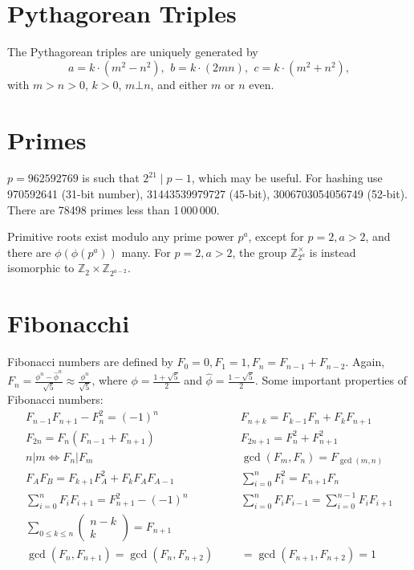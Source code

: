 
\section{Pythagorean Triples}
 The Pythagorean triples are uniquely generated by
 \[ a=k\cdot (m^{2}-n^{2}),\ \,b=k\cdot (2mn),\ \,c=k\cdot (m^{2}+n^{2}), \]
 with $m > n > 0$, $k > 0$, $m \bot n$, and either $m$ or $n$ even.

\section{Primes}
	$p=962592769$ is such that $2^{21} \mid p-1$, which may be useful. For hashing
	use 970592641 (31-bit number), 31443539979727 (45-bit), 3006703054056749
	(52-bit). There are 78498 primes less than 1\,000\,000.

	Primitive roots exist modulo any prime power $p^a$, except for $p = 2, a > 2$, and there are $\phi(\phi(p^a))$ many.
	For $p = 2, a > 2$, the group $\mathbb Z_{2^a}^\times$ is instead isomorphic to $\mathbb Z_2 \times \mathbb Z_{2^{a-2}}$.
\section{Fibonacchi}
Fibonacci numbers are defined by $F_0 = 0, F_1 = 1, F_n = F_{n-1} + F_{n-2}$. Again, $F_n = \frac{\phi^n - \hat{\phi}^n}{\sqrt{5}} \approx \frac{\phi^n}{\sqrt{5}} $, where $\phi = \frac{1 + \sqrt{5}}{2}$ and $\hat{\phi} = \frac{1 - \sqrt{5}}{2}$.
Some important properties of Fibonacci numbers:
\begin{align*}
  F_{n-1}F_{n+1} - F_n^2 = (-1)^n &&& F_{n+k} = F_{k-1}F_{n} + F_kF_{n+1} \\
  F_{2n} = F_n(F_{n-1} + F_{n+1}) &&& F_{2n+1} = F_n^2 + F_{n+1}^2 \\
  n | m \Leftrightarrow F_n | F_m &&& \gcd(F_m, F_n) = F_{\gcd(m,n)} \\
  F_A F_B=F_{k+1} F_A^2+F_k F_A F_{A-1} &&& \sum_{i=0}^n F_i^2=F_{n+1} F_n \\
  \sum_{i=0}^n F_i F_{i+1}=F_{n+1}^2-(-1)^n &&&  \sum_{i=0}^n F_i F_{i-1}=\sum_{i=0}^{n-1} F_i F_{i+1}\\
  \sum_{0 \leq k \leq n}\left(\begin{array}{c}
  n-k \\
  k
  \end{array}\right)=F_{n+1} &&& \\ 
  \operatorname{gcd}\left(F_n, F_{n+1}\right)=\operatorname{gcd}\left(F_n, F_{n+2}\right)&&&= \operatorname{gcd}\left(F_{n+1}, F_{n+2}\right)=1
\end{align*}
